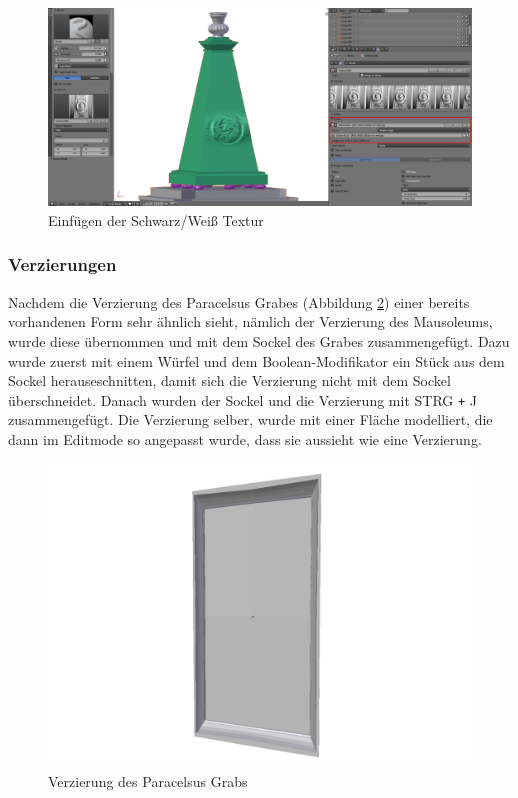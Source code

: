 \begin{figure}[h]
    \centering
    \includegraphics[width=.8\textwidth]{images/Paracelsus-Grab_Brush.png}
    \caption{Einfügen der Schwarz/Weiß Textur}
    \label{Paracelsus_Grab:image4}
\end{figure}

\subsubsection{Verzierungen}
Nachdem die Verzierung des Paracelsus Grabes (Abbildung \ref{Paracelsus_Grab:image3}) einer bereits vorhandenen Form sehr ähnlich sieht, nämlich der Verzierung des Mausoleums, wurde diese übernommen und
mit dem Sockel des Grabes zusammengefügt. Dazu wurde zuerst mit einem Würfel und dem Boolean-Modifikator ein Stück aus dem Sockel herauseschnitten, damit
sich die Verzierung nicht mit dem Sockel überschneidet. Danach wurden der Sockel und die Verzierung mit STRG \verb-+- J zusammengefügt. Die Verzierung selber, wurde mit einer
Fläche modelliert, die dann im Editmode so angepasst wurde, dass sie aussieht wie eine Verzierung.
\begin{figure}[h]
    \centering
    \includegraphics[width=.8\textwidth]{images/Paracelsus-Grab_Verzierung.png}
    \caption{Verzierung des Paracelsus Grabs}
    \label{Paracelsus_Grab:image3}
\end{figure}

